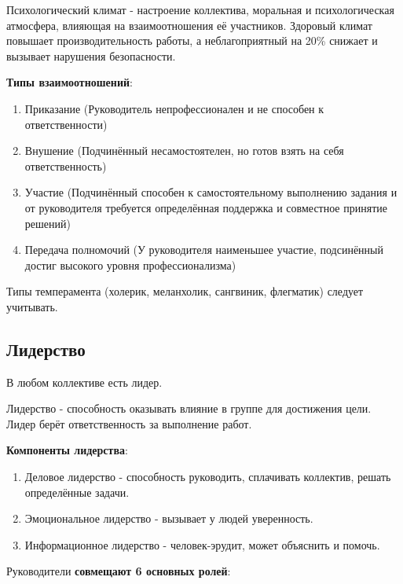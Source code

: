 \documentclass{article}
\begin{document}
Психологический климат - настроение коллектива, моральная и психологическая атмосфера, влияющая на взаимоотношения её участников. Здоровый климат повышает производительность работы, а неблагоприятный на 20\% снижает и вызывает нарушения безопасности.

\textbf{Типы взаимоотношений}:

\begin{enumerate}
    \item Приказание (Руководитель непрофессионален и не способен к ответственности)
    \item Внушение (Подчинённый несамостоятелен, но готов взять на себя ответственность)
    \item Участие (Подчинённый способен к самостоятельному выполнению задания и от руководителя требуется определённая поддержка и совместное принятие решений)
    \item Передача полномочий (У руководителя наименьшее участие, подсинённый достиг высокого уровня профессионализма)
\end{enumerate}

Типы темперамента (холерик, меланхолик, сангвиник, флегматик) следует учитывать.

\subsection{Лидерство}

В любом коллективе есть лидер.

Лидерство - способность оказывать влияние в группе для достижения цели. Лидер берёт ответственность за выполнение работ.

\begin{multienumerate}
\end{multienumerate}

\textbf{Компоненты лидерства}:

\begin{enumerate}
    \item Деловое лидерство - способность руководить, сплачивать коллектив, решать определённые задачи.
    \item Эмоциональное лидерство - вызывает у людей уверенность.
    \item Информационное лидерство - человек-эрудит, может объяснить и помочь.
\end{enumerate}

Руководители \textbf{совмещают 6 основных ролей}:
\end{document}
